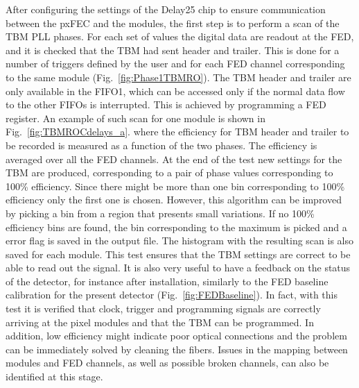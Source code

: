 After configuring the settings of the Delay25 chip to ensure communication between the pxFEC and the modules, the first step is to perform a scan of the TBM PLL phases.
For each set of values the digital data are readout at the FED, and it is checked that the TBM had sent header and trailer. This is done for a number of triggers defined by the user
and for each FED channel corresponding to the same module (Fig.~\ref{fig:Phase1TBMRO}).
The TBM header and trailer are only available in the FIFO1, which can be accessed only if the normal data flow to the other FIFOs is interrupted. This is achieved by programming a FED register.
An example of such scan for one module is shown in Fig.~\ref{fig:TBMROCdelays_a}. where the efficiency for TBM header and trailer to be recorded is measured as a function of the two phases.
The efficiency is averaged over all the FED channels.
At the end of the test new settings for the TBM are produced, corresponding to a pair of phase values corresponding to 100\% efficiency. Since there might be more than one bin corresponding to 100\% efficiency only the first one is chosen. However, this algorithm can be improved by picking a bin from a region that presents small variations. If no 100\% efficiency bins are found, the bin corresponding to the maximum is picked and a error flag is saved in the output file. The histogram with the resulting scan is also saved for each module.
This test ensures that the TBM settings are correct to be able to read out the signal. It is also very useful to have a feedback on the status of the detector, for instance after installation, similarly to the FED baseline calibration for the present detector (Fig.~\ref{fig:FEDBaseline}). In fact, with this test it is verified that clock, trigger and programming signals are correctly arriving at the pixel modules and that the TBM can be programmed.
In addition, low efficiency might indicate poor optical connections and the problem can be immediately solved by cleaning the fibers.
Issues in the mapping between modules and FED channels, as well as possible broken channels, can also be identified at this stage.\\

